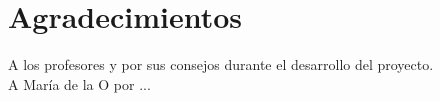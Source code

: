 %
%
\chapter*{Agradecimientos}
\vspace*{2cm}

A los profesores {\director} y {\tutor} por sus consejos durante el desarrollo del proyecto. \\

A María de la O por ... \\
